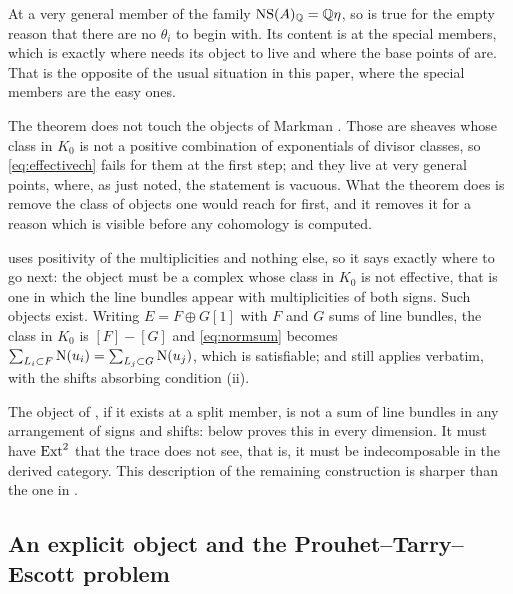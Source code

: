 \begin{remark}\label{rem:markmanpositivity}
At a very general member of the family $\mathrm{NS}(A)_{\mathbb{Q}}=\mathbb{Q}\eta$, so
 is true for the empty reason that there are no
$\theta_{i}$ to begin with. Its content is at the special members, which is
exactly where  needs its object to live and where the
base points of \cite[Theorem~15.27]{paperI} are. That is the opposite of the usual
situation in this paper, where the special members are the easy ones.

The theorem does not touch the objects of Markman \cite{Mar25a,Mar25b}.
Those are sheaves whose class in $K_{0}$ is not a positive combination of
exponentials of divisor classes, so \eqref{eq:effectivech} fails for them at
the first step; and they live at very general points, where, as just noted,
the statement is vacuous. What the theorem does is remove the class of
objects one would reach for first, and it removes it for a reason which is
visible before any cohomology is computed.
\end{remark}

\begin{remark}
\label{rem:whatitmustbe}
 uses positivity of the multiplicities and nothing else,
so it says exactly where to go next: the object must be a complex whose
class in $K_{0}$ is not effective, that is one in which the line bundles
appear with multiplicities of both signs. Such objects exist. Writing
$E=F\oplus G[1]$ with $F$ and $G$ sums of line bundles, the class in $K_{0}$
is $[F]-[G]$ and \eqref{eq:normsum} becomes
$\sum_{L_{i}\subset F}\mathrm{N}(u_{i})=\sum_{L_{j}\subset G}\mathrm{N}(u_{j})$, which is
satisfiable; and  still applies verbatim, with the
shifts absorbing condition (ii).

The object of , if it exists at a split member, is
not a sum of line bundles in any arrangement of signs and shifts:
 below proves this in every dimension. It must have
$\operatorname{Ext}^{2}$ that the trace does not see, that is, it must be indecomposable in
the derived category. This description of the remaining construction is
sharper than the one in .
\end{remark}

\subsection{An explicit object and the Prouhet--Tarry--Escott problem}
\label{ssec:pte}

